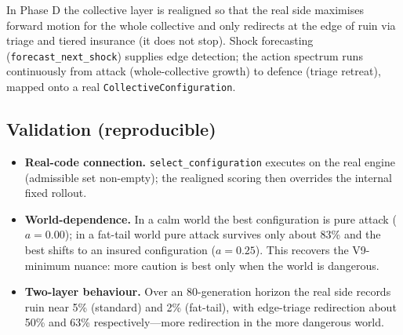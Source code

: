 In Phase D the collective layer is realigned so that the real side maximises
forward motion for the whole collective and only redirects at the edge of ruin
via triage and tiered insurance (it does not stop). Shock forecasting
(\texttt{forecast\_next\_shock}) supplies edge detection; the action spectrum
runs continuously from attack (whole-collective growth) to defence (triage
retreat), mapped onto a real \texttt{CollectiveConfiguration}.

\subsection{Validation (reproducible)}
\begin{itemize}
  \item \textbf{Real-code connection.} \texttt{select\_configuration} executes on
        the real engine (admissible set non-empty); the realigned scoring then
        overrides the internal fixed rollout.
  \item \textbf{World-dependence.} In a calm world the best configuration is
        pure attack ($a=0.00$); in a fat-tail world pure attack survives only
        about 83\% and the best shifts to an insured configuration ($a=0.25$).
        This recovers the V9-minimum nuance: more caution is best only when the
        world is dangerous.
  \item \textbf{Two-layer behaviour.} Over an 80-generation horizon the real
        side records ruin near 5\% (standard) and 2\% (fat-tail), with
        edge-triage redirection about 50\% and 63\% respectively---more
        redirection in the more dangerous world.
\end{itemize}

